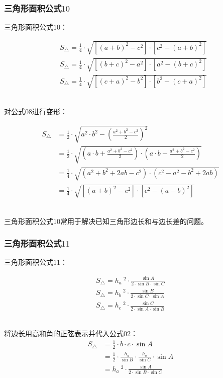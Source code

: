 \documentclass[UTF8]{ctexart}
\begin{document}
\subsubsection{三角形面积公式$10$}
    三角形面积公式$10$：
    \begin{large}
        \begin{align*}
            &S_{\triangle}=\frac{1}{4}\cdot\sqrt{\left[(a+b)^2-c^2\right]\cdot\left[c^2-(a+b)^2\right]}\\[3mm]
            &S_{\triangle}=\frac{1}{4}\cdot\sqrt{\left[(b+c)^2-a^2\right]\cdot\left[a^2-(b+c)^2\right]}\\[3mm]
            &S_{\triangle}=\frac{1}{4}\cdot\sqrt{\left[(c+a)^2-b^2\right]\cdot\left[b^2-(c+a)^2\right]}
        \end{align*}
    \end{large}\\
    对公式$08$进行变形：
    \setcounter{equation}{0}
    \begin{large}
        \begin{align}
            S_{\triangle}
            &=\frac{1}{2}\cdot\sqrt{a^2\cdot b^2-\left(\frac{a^2+b^2-c^2}{2}\right)^2}\\[4mm]
            &=\frac{1}{2}\cdot\sqrt{\left(a\cdot b+\frac{a^2+b^2-c^2}{2}\right)\cdot\left(a\cdot b-\frac{a^2+b^2-c^2}{2}\right)}\\[4mm]
            &=\frac{1}{4}\cdot\sqrt{\left(a^2+b^2+2ab-c^2\right)\cdot\left(c^2-a^2-b^2+2ab\right)}\\[4mm]
            &=\frac{1}{4}\cdot\sqrt{\left[(a+b)^2-c^2\right]\cdot\left[c^2-(a-b)^2\right]}
        \end{align}
    \end{large}\\
    三角形面积公式$10$常用于解决已知三角形边长和与边长差的问题。

\newpage

\subsubsection{三角形面积公式$11$}
    三角形面积公式$11$：
    \begin{large}
        \begin{align*}
            S_{\triangle}=h_a~^2\cdot\frac{\sin{A}}{2\cdot\sin{B}\cdot\sin{C}}\\[3mm]
            S_{\triangle}=h_b~^2\cdot\frac{\sin{B}}{2\cdot\sin{C}\cdot\sin{A}}\\[3mm]
            S_{\triangle}=h_c~^2\cdot\frac{\sin{C}}{2\cdot\sin{A}\cdot\sin{B}}
        \end{align*}
    \end{large}\\
    将边长用高和角的正弦表示并代入公式$02$：
    \setcounter{equation}{0}
    \begin{align}
        S_{\triangle}
        &=\frac{1}{2}\cdot b\cdot c\cdot\sin{A}\\[4mm]
        &=\frac{1}{2}\cdot\frac{h_a}{\sin{B}}\cdot\frac{h_a}{\sin{C}}\cdot\sin{A}\\[4mm]
        &=h_a~^2\cdot\frac{\sin{A}}{2\cdot\sin{B}\cdot\sin{C}}
    \end{align}
\end{document}
